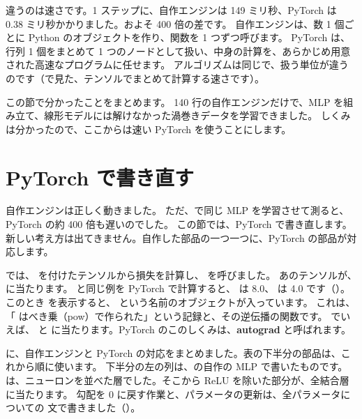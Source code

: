 違うのは速さです。1 ステップに、自作エンジンは 149 ミリ秒、PyTorch は 0.38 ミリ秒かかりました。およそ 400 倍の差です。
自作エンジンは、数 1 個ごとに Python のオブジェクトを作り、関数を 1 つずつ呼びます。
PyTorch は、行列 1 個をまとめて 1 つのノードとして扱い、中身の計算を、あらかじめ用意された高速なプログラムに任せます。
アルゴリズムは同じで、扱う単位が違うのです（で見た、テンソルでまとめて計算する速さです）。

この節で分かったことをまとめます。
140 行の自作エンジンだけで、MLP を組み立て、線形モデルには解けなかった渦巻きデータを学習できました。
しくみは分かったので、ここからは速い PyTorch を使うことにします。

\section{PyTorch で書き直す}\label{sec:nn-pytorch}
\suppressfloats[t]

自作エンジンは正しく動きました。
ただ、で同じ MLP を学習させて測ると、PyTorch の約 400 倍も遅いのでした。
この節では、PyTorch で書き直します。
新しい考え方は出てきません。自作した部品の一つ一つに、PyTorch の部品が対応します。

では、 を付けたテンソルから損失を計算し、 を呼びました。
あのテンソルが、 に当たります。
と同じ例を PyTorch で計算すると、 は 8.0、 は 4.0 です（）。
このとき  を表示すると、 という名前のオブジェクトが入っています。
これは、「 はべき乗（pow）で作られた」という記録と、その逆伝播の関数です。
 でいえば、 と  に当たります。PyTorch のこのしくみは、\textbf{autograd} と呼ばれます。

に、自作エンジンと PyTorch の対応をまとめました。表の下半分の部品は、これから順に使います。
下半分の左の列は、の自作の MLP で書いたものです。
 は、ニューロンを並べた層でした。そこから ReLU を除いた部分が、全結合層に当たります。
勾配を 0 に戻す作業と、パラメータの更新は、全パラメータについての  文で書きました（）。

